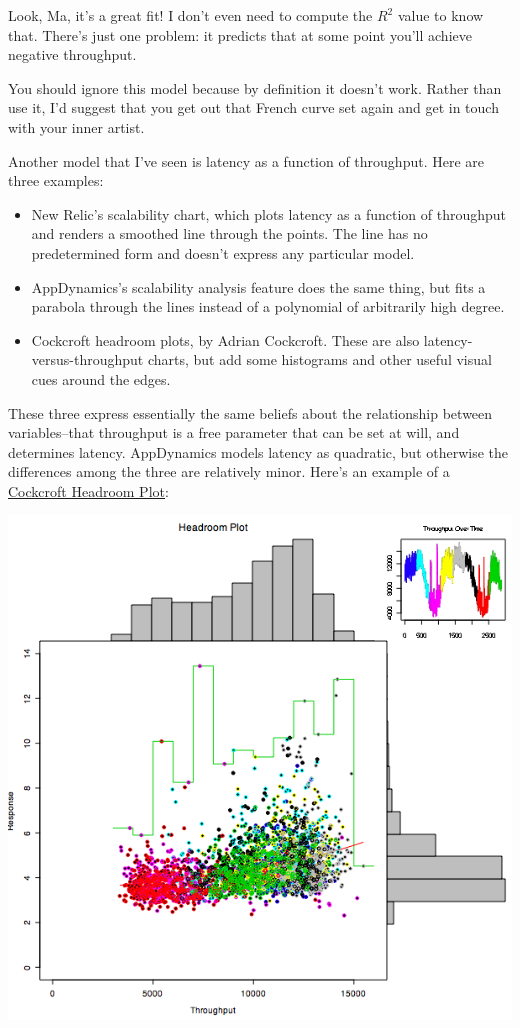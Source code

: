 \documentclass{vivid_layout}
\begin{document}
Look, Ma, it's a great fit! I don't even need to compute the $R^2$ value to know
that. There's just one problem: it predicts that at some point you'll achieve
negative throughput.

You should ignore this model because by definition it doesn't work. Rather than
use it, I'd suggest that you get out that French curve set again and get in
touch with your inner artist.

Another model that I've seen is latency as a function of throughput. Here
are three examples:

\begin{itemize}
\item New Relic's scalability chart, which plots latency as a function of
throughput and renders a smoothed line through the points. The line has no
predetermined form and doesn't express any particular model.
\item AppDynamics's scalability analysis feature does the same thing, but fits a
parabola through the lines instead of a polynomial of arbitrarily high degree.
\item Cockcroft headroom plots, by Adrian Cockcroft. These are also
latency-versus-throughput charts, but add some histograms and other useful
visual cues around the edges.
\end{itemize}

These three express essentially the same beliefs about the relationship between
variables--that throughput is a free parameter that can be set at will, and
determines latency.  AppDynamics models latency as quadratic, but otherwise
the differences among the three are relatively minor. Here's an example of a
\href{http://perfcap.blogspot.com/2008/07/enhanced-headroom-plot-in-r.html}{Cockcroft
Headroom Plot}:
\begin{center}
\includegraphics[width=.85\linewidth]{scalability/chpblog3}
\end{center}
\end{document}

